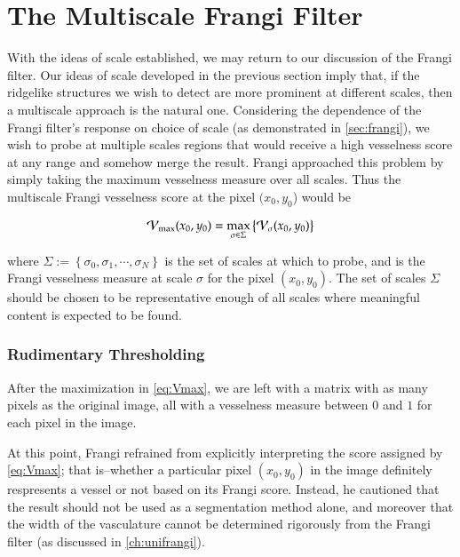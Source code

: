  \chapter{The Multiscale Frangi Filter} \label{ch:multifrangi}
    
     With the ideas of scale established, we may return to our discussion of the Frangi filter.
    Our ideas of scale developed in the previous section imply that, if the ridgelike structures we wish to detect are more prominent at different scales, then a multiscale approach is the natural one. Considering the dependence of the Frangi filter's response on choice of scale (as demonstrated in \cref{sec:frangi}), we wish to probe at multiple scales
    regions that would receive a high vesselness score at any range and somehow merge the result. Frangi \cite{frangi-paper} approached this problem by simply taking the maximum vesselness measure over all scales. Thus the multiscale Frangi vesselness score at the pixel $(x_0, y_0$) would be 
    
    \begin{equation} \label{eq:Vmax}
    \mathcal{V}_{\max}(x_0, y_0) =
    	\underset{\sigma \in \Sigma}{\max}\left\{  \mathcal{V}_{\sigma} (x_0, y_0) \right\}
    \end{equation}
    
    where $\Sigma := \left\{ \sigma_0, \sigma_1 , \cdots, \sigma_N \right\}$ is
    the set of scales at which to probe, and \Vsigma is the Frangi vesselness measure at scale $\sigma$ for the pixel $(x_0,y_0)$. The set of scales $\Sigma$ should be chosen to be representative enough of all scales where meaningful content is expected to be found.
    
   
    \subsection{Rudimentary Thresholding}
    
    After the maximization in \cref{eq:Vmax}, we are left with a matrix with as many pixels as the original image, all with a vesselness measure between $0$ and $1$ for each pixel in the image.
         
    At this point, Frangi \cite{frangi-paper} refrained from explicitly interpreting the score assigned by \cref{eq:Vmax}; that is--whether a particular pixel $(x_0,y_0)$ in the image definitely respresents a vessel or not based on its Frangi score. Instead, he cautioned that the result should not be used as a segmentation method alone, and moreover that the width of the vasculature cannot be determined rigorously from the Frangi filter (as discussed in \cref{ch:unifrangi}).
   
